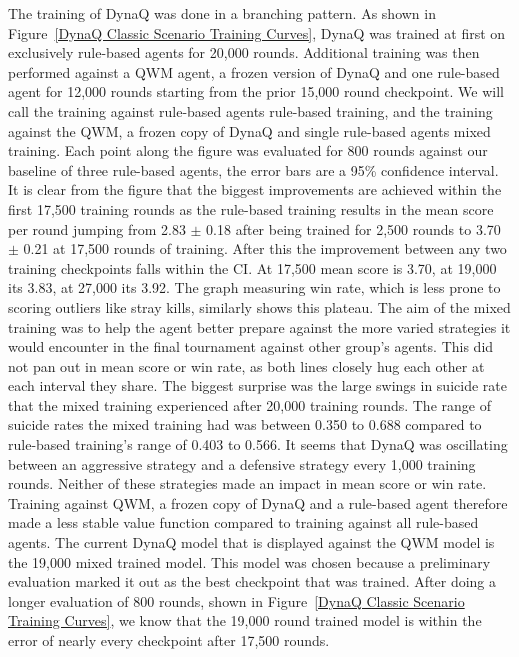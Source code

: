 \documentclass[article, 10pt]{IEEEtran}
\begin{document}
The training of DynaQ was done in a branching pattern. As shown in Figure~\ref{DynaQ Classic Scenario Training Curves}, DynaQ was trained at first on exclusively rule-based agents for 20,000 rounds. Additional training was then performed against a QWM agent, a frozen version of DynaQ and one rule-based agent for 12,000 rounds starting from the prior 15,000 round checkpoint. We will call the training against rule-based agents rule-based training, and the training against the QWM, a frozen copy of DynaQ and single rule-based agents mixed training. Each point along the figure was evaluated for 800 rounds against our baseline of three rule-based agents, the error bars are a 95\% confidence interval. It is clear from the figure that the biggest improvements are achieved within the first 17,500 training rounds as the rule-based training results in the mean score per round jumping from 2.83 $\pm$ 0.18 after being trained for 2,500 rounds to 3.70 $\pm$ 0.21 at 17,500 rounds of training. After this the improvement between any two training checkpoints falls within the CI. At 17,500 mean score is 3.70, at 19,000 its 3.83, at 27,000 its 3.92. The graph measuring win rate, which is less prone to scoring outliers like stray kills, similarly shows this plateau. The aim of the mixed training was to help the agent better prepare against the more varied strategies it would encounter in the final tournament against other group's agents. This did not pan out in mean score or win rate, as both lines closely hug each other at each interval they share. The biggest surprise was the large swings in suicide rate that the mixed training experienced after 20,000 training rounds. The range of suicide rates the mixed training had was between 0.350 to 0.688 compared to rule-based training's range of 0.403 to 0.566. It seems that DynaQ was oscillating between an aggressive strategy and a defensive strategy every 1,000 training rounds. Neither of these strategies made an impact in mean score or win rate. Training against QWM, a frozen copy of DynaQ and a rule-based agent therefore made a less stable value function compared to training against all rule-based agents. The current DynaQ model that is displayed against the QWM model is the 19,000 mixed trained model. This model was chosen because a preliminary evaluation marked it out as the best checkpoint that was trained. After doing a longer evaluation of 800 rounds, shown in Figure~\ref{DynaQ Classic Scenario Training Curves}, we know that the 19,000 round trained model is within the error of nearly every checkpoint after 17,500 rounds. 
\end{document}
